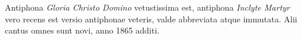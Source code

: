 Antiphona \emph{Gloria Christo Domino} vetustissima est,
antiphona \emph{Inclyte Martyr} vero recens est versio antiphonae veteris,
valde abbreviata atque immutata.
Alii cantus omnes sunt novi, anno 1865 additi.

